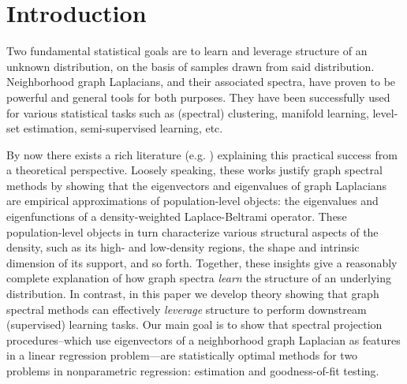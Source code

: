 \section{Introduction}
\label{sec:introduction}
Two fundamental statistical goals are to learn and leverage structure of an unknown distribution, on the basis of samples drawn from said distribution. Neighborhood graph Laplacians, and their associated spectra, have proven to be powerful and general tools for both purposes. They have been successfully used for various statistical tasks such as (spectral) clustering, manifold learning, level-set estimation, semi-supervised learning, etc.

By now there exists a rich literature (e.g. \citep{koltchinskii2000,belkin07,vonluxburg2008,burago2014,shi2015,singer2017,garciatrillos18,trillos2019, calder2019, cheng2021,dunson2021}) explaining this practical success from a theoretical perspective. Loosely speaking, these works justify graph spectral methods by showing that the eigenvectors and eigenvalues of graph Laplacians are empirical approximations of population-level objects: the eigenvalues and eigenfunctions of a density-weighted Laplace-Beltrami operator. These population-level objects in turn characterize various structural aspects of the density, such as its high- and low-density regions, the shape and intrinsic dimension of its support, and so forth. Together, these insights give a reasonably complete explanation of how graph spectra \emph{learn} the structure of an underlying distribution. In contrast, in this paper we develop theory showing that graph spectral methods can effectively \emph{leverage} structure to perform downstream (supervised) learning tasks. Our main goal is to show that spectral projection procedures--which use eigenvectors of a neighborhood graph Laplacian as features in a linear regression problem---are statistically optimal methods for two problems in nonparametric regression: estimation and goodness-of-fit testing.

